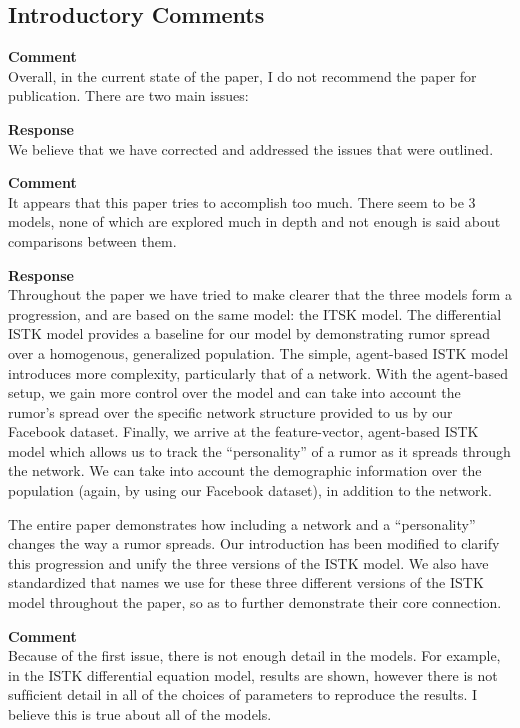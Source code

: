 \subsection{Introductory Comments}
\setcounter{rev2-intro}{1}

\textbf{Comment } \\
Overall, in the current state of the paper, I do not recommend the paper for publication.
There are two main issues:

\textbf{Response } \\
We believe that we have corrected and addressed the issues that were outlined.

\textbf{Comment } \\
It appears that this paper tries to accomplish too much.
There seem to be 3 models, none of which are explored much in depth and not enough is said about comparisons between them.

\textbf{Response } \\
Throughout the paper we have tried to make clearer that the three models form a progression, and are based on the same model: the ITSK model.
The differential ISTK model provides a baseline for our model by demonstrating rumor spread over a homogenous, generalized population.
The simple, agent-based ISTK model introduces more complexity, particularly that of a network.
With the agent-based setup, we gain more control over the model and can take into account the rumor's spread over the specific network structure provided to us by our Facebook dataset.
Finally, we arrive at the feature-vector, agent-based ISTK model which allows us to track the ``personality'' of a rumor as it spreads through the network.
We can take into account the demographic information over the population (again, by using our Facebook dataset), in addition to the network.

The entire paper demonstrates how including a network and a ``personality'' changes the way a rumor spreads.
Our introduction has been modified to clarify this progression and unify the three versions of the ISTK model.
We also have standardized that names we use for these three different versions of the ISTK model throughout the paper, so as to further demonstrate their core connection.

\textbf{Comment } \\
Because of the ﬁrst issue, there is not enough detail in the models.
For example, in the ISTK differential equation model, results are shown, however there is not sufﬁcient detail in all of the choices of parameters to reproduce the results.
I believe this is true about all of the models.

